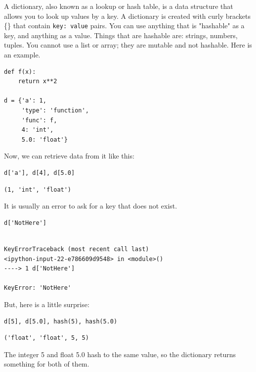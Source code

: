 \documentclass[11pt]{article}
\begin{document}
A dictionary, also known as a lookup or hash table, is a data structure that allows you to look up values by a key. A dictionary is created with curly brackets \{\} that contain \texttt{key: value} pairs. You can use anything that is "hashable" as a key, and anything as a value. Things that are hashable are: strings, numbers, tuples. You cannot use a list or array; they are mutable and not hashable. Here is an example.

\begin{verbatim}
def f(x):
    return x**2

d = {'a': 1,
     'type': 'function',
     'func': f,
     4: 'int',
     5.0: 'float'}
\end{verbatim}

Now, we can retrieve data from it like this:

\begin{verbatim}
d['a'], d[4], d[5.0]
\end{verbatim}

\begin{verbatim}
(1, 'int', 'float')
\end{verbatim}

It is usually an error to ask for a key that does not exist.

\begin{verbatim}
d['NotHere']
\end{verbatim}

\begin{verbatim}

KeyErrorTraceback (most recent call last)
<ipython-input-22-e786609d9548> in <module>()
----> 1 d['NotHere']

KeyError: 'NotHere'
\end{verbatim}


But, here is a little surprise:

\begin{verbatim}
d[5], d[5.0], hash(5), hash(5.0)
\end{verbatim}

\begin{verbatim}
('float', 'float', 5, 5)
\end{verbatim}

The integer 5 and float 5.0 hash to the same value, so the dictionary returns something for both of them.
\end{document}
